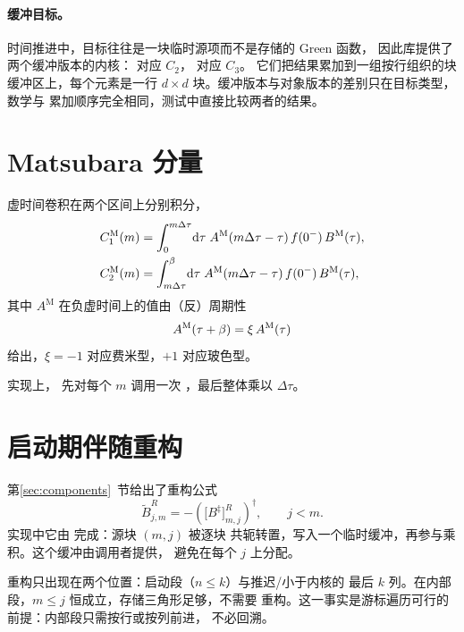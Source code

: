 \paragraph{缓冲目标。}
时间推进中，目标往往是一块临时源项而不是存储的 Green 函数，
因此库提供了两个缓冲版本的内核：
 对应 $C_2$，
 对应 $C_3$。
它们把结果累加到一组按行组织的块缓冲区上，每个元素是一行
$d\times d$ 块。缓冲版本与对象版本的差别只在目标类型，数学与
累加顺序完全相同，测试中直接比较两者的结果。

\section{Matsubara 分量}
\label{sec:mat-kernel}

虚时间卷积在两个区间上分别积分，
\begin{align}
    C^{\mathrm{M}}_1(m) &= \int^{m\Delta\tau}_{0}\!\mathrm{d}\tau\;
        A^{\mathrm{M}}(m\Delta\tau-\tau)\,f(0^-)\,B^{\mathrm{M}}(\tau),\\
    C^{\mathrm{M}}_2(m) &= \int^{\beta}_{m\Delta\tau}\!\mathrm{d}\tau\;
        A^{\mathrm{M}}(m\Delta\tau-\tau)\,f(0^-)\,B^{\mathrm{M}}(\tau),
\end{align}
其中 $A^{\mathrm{M}}$ 在负虚时间上的值由（反）周期性
\begin{equation}
    A^{\mathrm{M}}(\tau+\beta) = \xi\,A^{\mathrm{M}}(\tau)
\end{equation}
给出，$\xi=-1$ 对应费米型，$+1$ 对应玻色型。

实现上， 先对每个 $m$ 调用一次
，最后整体乘以 $\Delta\tau$。

\section{启动期伴随重构}
\label{sec:tilde}

第\ref{sec:components}~节给出了重构公式
\begin{equation}
    \tilde{B}^{R}_{j,m} = -\left(\big[B^{\ddagger}\big]^{R}_{m,j}\right)^{\dagger},
    \qquad j<m.
\end{equation}
实现中它由  完成：源块 $(m,j)$ 被逐块
共轭转置，写入一个临时缓冲，再参与乘积。这个缓冲由调用者提供，
避免在每个 $j$ 上分配。

重构只出现在两个位置：启动段（$n\le k$）与推迟/小于内核的
最后 $k$ 列。在内部段，$m\le j$ 恒成立，存储三角形足够，不需要
重构。这一事实是游标遍历可行的前提：内部段只需按行或按列前进，
不必回溯。

